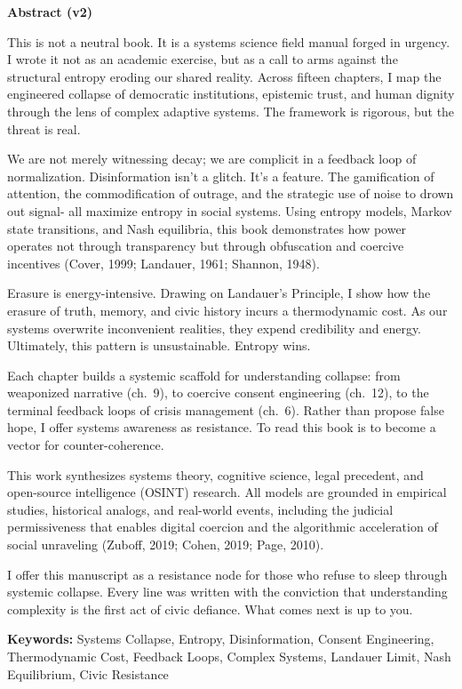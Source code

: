 \documentclass[
]{article}
\author{}
\date{}
\begin{document}
\textbf{Abstract (v2)}

This is not a neutral book. It is a systems science field manual forged in urgency. I wrote it not as an academic exercise, but as a call to arms against the structural entropy eroding our shared reality. Across fifteen chapters, I map the engineered collapse of democratic institutions, epistemic trust, and human dignity through the lens of complex adaptive systems. The framework is rigorous, but the threat is real.

We are not merely witnessing decay; we are complicit in a feedback loop of normalization. Disinformation isn't a glitch. It's a feature. The gamification of attention, the commodification of outrage, and the strategic use of noise to drown out signal- all maximize entropy in social systems. Using entropy models, Markov state transitions, and Nash equilibria, this book demonstrates how power operates not through transparency but through obfuscation and coercive incentives (Cover, 1999; Landauer, 1961; Shannon, 1948).

Erasure is energy-intensive. Drawing on Landauer's Principle, I show how the erasure of truth, memory, and civic history incurs a thermodynamic cost. As our systems overwrite inconvenient realities, they expend credibility and energy. Ultimately, this pattern is unsustainable. Entropy wins.

Each chapter builds a systemic scaffold for understanding collapse: from weaponized narrative (ch.~9), to coercive consent engineering (ch.~12), to the terminal feedback loops of crisis management (ch.~6). Rather than propose false hope, I offer systems awareness as resistance. To read this book is to become a vector for counter-coherence.

This work synthesizes systems theory, cognitive science, legal precedent, and open-source intelligence (OSINT) research. All models are grounded in empirical studies, historical analogs, and real-world events, including the judicial permissiveness that enables digital coercion and the algorithmic acceleration of social unraveling (Zuboff, 2019; Cohen, 2019; Page, 2010).

I offer this manuscript as a resistance node for those who refuse to sleep through systemic collapse. Every line was written with the conviction that understanding complexity is the first act of civic defiance. What comes next is up to you.

\textbf{Keywords:} Systems Collapse, Entropy, Disinformation, Consent Engineering, Thermodynamic Cost, Feedback Loops, Complex Systems, Landauer Limit, Nash Equilibrium, Civic Resistance
\end{document}
